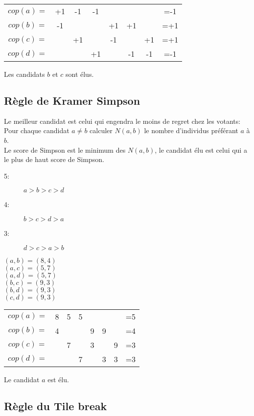 \begin{tabular}{c|cccccc|c}
$cop(a)=$&+1&-1&-1&$ $&$ $&$ $&=-1\\
$cop(b)=$&-1&$ $&$ $&+1&+1&$ $&=+1\\
$cop(c)=$&$ $&+1&$ $&-1&$ $&+1&=+1\\
$cop(d)=$&$ $&$ $&+1&$ $&-1&-1&=-1\\
\end{tabular}

Les candidats $b$ et $c$ sont élus.
\pagebreak
\subsection{Règle de Kramer Simpson}
Le meilleur candidat est celui qui engendra le moins de regret chez les votants:\\
Pour chaque candidat $a \neq b$ calculer $N(a,b)$ le nombre d'individus préférant $a$ à $b$.\\
Le score de Simpson est le minimum des $N(a,b)$, le candidat élu est celui qui a le plus de haut score de Simpson.\\

\begin{description}
\item[5:] $a > b > c > d$
\item[4:] $b > c > d > a$
\item[3:] $d > c > a > b$
\end{description}

\begin{multicols}{3}
$(a,b) = (8,4)$\\$(a,c) = (5,7)$\\$(a,d) = (5,7)$\\
$(b,c) = (9,3)$\\$(b,d) = (9,3)$\\$(c,d) = (9,3)$\\
\end{multicols}

\begin{tabular}{c|cccccc|c}
$cop(a)=$&8&5&5&$ $&$ $&$ $&=5\\
$cop(b)=$&4&$ $&$ $&9&9&$ $&=4\\
$cop(c)=$&$ $&7&$ $&3&$ $&9&=3\\
$cop(d)=$&$ $&$ $&7&$ $&3&3&=3\\
\end{tabular}

Le candidat $a$ est élu.

\subsection{Règle du Tile break}

